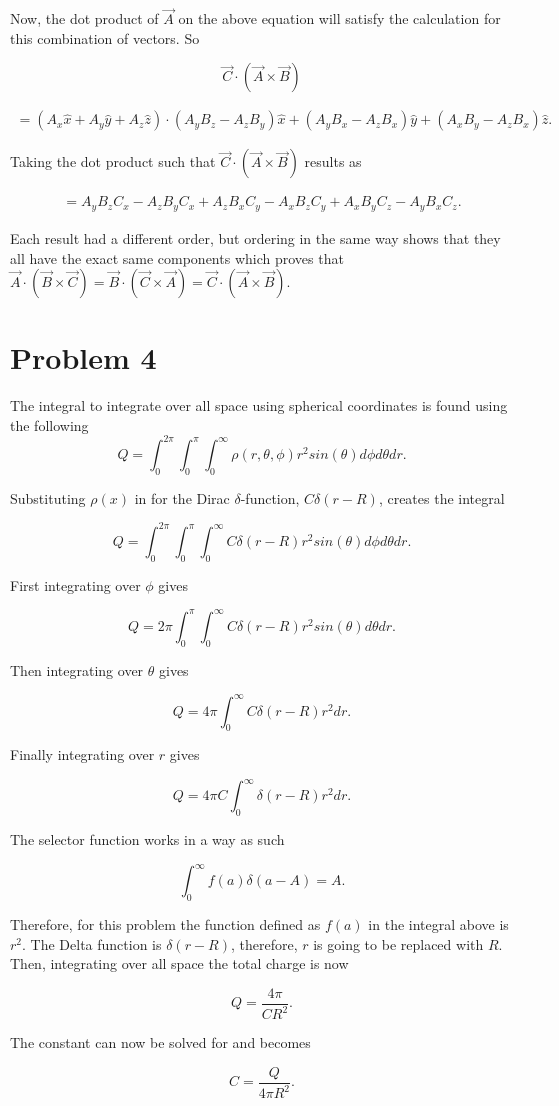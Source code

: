 \documentclass[11pt]{article}
\begin{document}
Now, the dot product of $\vec{A}$ on the above equation will satisfy 
the calculation for this combination of vectors. So 

$$
\vec{C} \cdot (\vec{A} \times \vec{B}) 
$$

\begin{eqnarray*}
= (A_{x}\hat{x} + A_{y}\hat{y} + A_{z}\hat{z}) \cdot
(A_{y}B_{z} - A_{z}B_{y})\hat{x} 
+ (A_{y}B_{x} - A_{z}B_{x})\hat{y}
+ (A_{x}B_{y} - A_{z}B_{x})\hat{z}.
\end{eqnarray*}

Taking the dot product such that $\vec{C} \cdot (\vec{A} \times \vec{B})$
results as
    
\begin{eqnarray*}
= A_{y}B_{z}C_{x} - A_{z}B_{y}C_{x} + A_{z}B_{x}C_{y} 
- A_{x}B_{z}C_{y} + A_{x}B_{y}C_{z} - A_{y}B_{x}C_{z}.
\end{eqnarray*}

Each result had a different order, but ordering in the same way shows that they all have the exact same components which proves that $\vec{A} \cdot (\vec{B} \times \vec{C}) = \vec{B} \cdot (\vec{C} \times \vec{A}) = \vec{C} \cdot (\vec{A} \times \vec{B})$.


\clearpage

\section*{Problem 4}

The integral to integrate over all space using spherical coordinates is found using the following
$$
Q = \int_{0}^{2\pi} \int_{0}^{\pi} \int_{0}^{\infty} \rho(r, \theta, \phi) r^{2}sin(\theta) d\phi d\theta dr.
$$

Substituting $\rho(x)$ in for the Dirac $\delta$-function, $C\delta(r - R)$, creates the integral 

$$
Q = \int_{0}^{2\pi} \int_{0}^{\pi} \int_{0}^{\infty}  C\delta(r - R) r^{2}sin(\theta) d\phi d\theta dr.
$$

First integrating over $\phi$ gives

$$
Q =  2\pi \int_{0}^{\pi} \int_{0}^{\infty}  C\delta(r - R) r^{2}sin(\theta) d\theta dr .
$$

Then integrating over $\theta$ gives

$$
Q =  4\pi \int_{0}^{\infty}  C\delta(r - R) r^{2} dr.
$$

Finally integrating over $r$ gives

$$
Q =  4\pi C \int_{0}^{\infty} \delta(r - R) r^{2} dr.
$$

The selector function works in a way as such

$$
\int_{0}^{\infty} f(a)\delta(a - A) = A.
$$

Therefore, for this problem the function defined as $f(a)$ in the integral above is $r^{2}$. The Delta function is $\delta(r - R)$, therefore, $r$ is going to be replaced with $R$. Then, integrating over all space the total charge is now

$$
Q =  \frac{4\pi}{C R^{2}}.
$$

The constant can now be solved for and becomes

$$
C =  \frac{Q}{4\pi  R^{2}}.
$$

\end{document}
